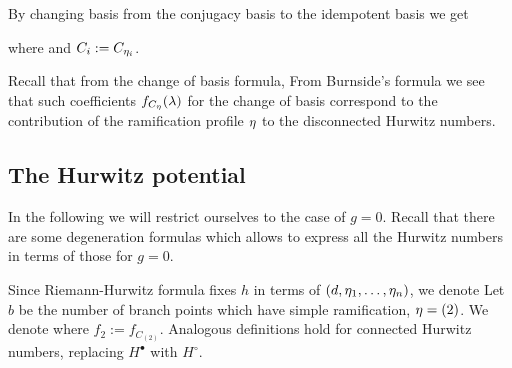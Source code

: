\documentclass[10pt]{beamer}
\begin{document}
\begin{frame}

By changing basis from the conjugacy basis to the idempotent basis we get

\begin{theorem}
	where
	and $C_i:=C_{\eta_i}$.
\end{theorem}

Recall that from the change of basis formula, 
From Burnside's formula we see that such coefficients $f_{C_\eta}(\lambda)$ for the change of basis correspond to the contribution of the ramification profile $\eta$ to the disconnected Hurwitz numbers. 

\end{frame}

\subsection{The Hurwitz potential}

\begin{frame}

In the following we will restrict ourselves to the case of $g=0$. Recall that there are some degeneration formulas which allows to express all the Hurwitz numbers in terms of those for $g=0$.  

Since Riemann-Hurwitz formula fixes $h$ in terms of $(d,\eta_1,\ldots,\eta_n)$, we denote
Let $b$ be the number of branch points which have simple ramification, \ie $\eta=(2)$. We denote
\vspace{-10pt}
where $f_2:=f_{C_{(2)}}$. Analogous definitions hold for connected Hurwitz numbers, replacing $H^\bullet$ with $H^\circ$. 

\end{frame}
\end{document}
